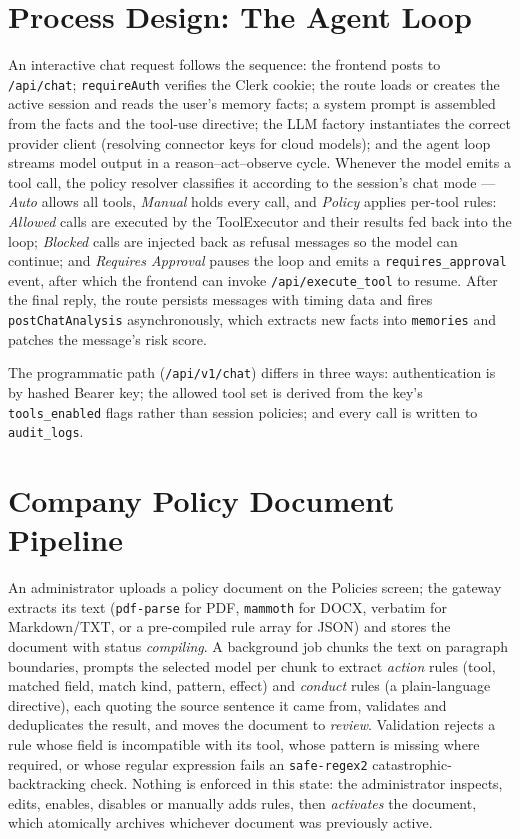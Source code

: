 \documentclass[12pt,a4paper,oneside]{report}
\begin{document}
\section{Process Design: The Agent Loop}
An interactive chat request follows the sequence: the frontend posts
to \texttt{/api/chat}; \texttt{requireAuth} verifies the Clerk cookie;
the route loads or creates the active session and reads the user's
memory facts; a system prompt is assembled from the facts and the
tool-use directive; the LLM factory instantiates the correct provider
client (resolving connector keys for cloud models); and the agent loop
streams model output in a reason--act--observe cycle. Whenever the
model emits a tool call, the policy resolver classifies it according
to the session's chat mode --- \emph{Auto} allows all tools,
\emph{Manual} holds every call, and \emph{Policy} applies per-tool
rules: \emph{Allowed} calls are executed by the ToolExecutor and
their results fed back into the loop; \emph{Blocked} calls are
injected back as refusal messages so the model can continue; and
\emph{Requires Approval} pauses the loop and emits a
\texttt{requires\_approval} event, after which the frontend can invoke
\texttt{/api/execute\_tool} to resume. After the final reply, the
route persists messages with timing data and fires
\texttt{postChatAnalysis} asynchronously, which extracts new facts
into \texttt{memories} and patches the message's risk score.

The programmatic path (\texttt{/api/v1/chat}) differs in three ways:
authentication is by hashed Bearer key; the allowed tool set is
derived from the key's \texttt{tools\_enabled} flags rather than
session policies; and every call is written to \texttt{audit\_logs}.

\section{Company Policy Document Pipeline}
An administrator uploads a policy document on the Policies
screen; the gateway extracts its text (\texttt{pdf-parse} for PDF,
\texttt{mammoth} for DOCX, verbatim for Markdown/TXT, or a
pre-compiled rule array for JSON) and stores the document with status
\emph{compiling}. A background job chunks the text on paragraph
boundaries, prompts the selected model per chunk to extract
\emph{action} rules (tool, matched field, match kind, pattern,
effect) and \emph{conduct} rules (a plain-language directive), each
quoting the source sentence it came from, validates and deduplicates
the result, and moves the document to \emph{review}. Validation
rejects a rule whose field is incompatible with its tool, whose
pattern is missing where required, or whose regular expression fails
an \texttt{safe-regex2} catastrophic-backtracking check. Nothing is
enforced in this state: the administrator inspects, edits, enables,
disables or manually adds rules, then \emph{activates} the document,
which atomically archives whichever document was previously active.
\end{document}
